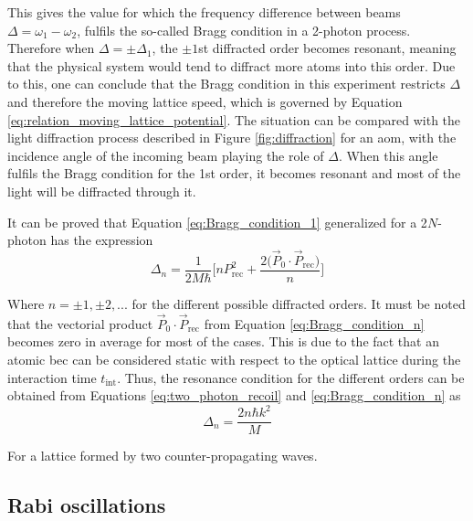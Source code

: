 This gives the value for which the frequency difference between beams $\Delta = \omega_1-\omega_2$, fulfils the so-called Bragg condition in a 2-photon process. Therefore when $\Delta = \pm\Delta_1$, the $\pm1$st diffracted order becomes resonant, meaning that the physical system would tend to diffract more atoms into this order. Due to this, one can conclude that the Bragg condition in this experiment restricts $\Delta$ and therefore the moving lattice speed, which is governed by Equation \eqref{eq:relation_moving_lattice_potential}. The situation can be compared with the light diffraction process described in Figure \ref{fig:diffraction} for an \ac{aom}, with the incidence angle of the incoming beam playing the role of $\Delta$. When this angle fulfils the Bragg condition for the 1st order, it becomes resonant and most of the light will be diffracted through it. 

It can be proved that Equation \eqref{eq:Bragg_condition_1} generalized for a 2$N$-photon has the expression \cite{Kozuma1999}
\begin{equation}\label{eq:Bragg_condition_n}
	\Delta_n = \frac{1}{2M\hbar} \Bigg[n P_{\text{rec}}^2 + \frac{2\big(\vec{P}_0 \cdot \vec{P}_{\text{rec}}\big)}{n}\Bigg]
\end{equation}

Where $n=\pm1, \pm2, \text{...}$ for the different possible diffracted orders. It must be noted that the vectorial product $\vec{P}_0 \cdot \vec{P}_{\text{rec}}$ from Equation \eqref{eq:Bragg_condition_n} becomes zero in average for most of the cases. This is due to the fact that an atomic \ac{bec} can be considered static with respect to the optical lattice during the interaction time $t_{\text{int}}$. Thus, the resonance condition for the different orders can be obtained from Equations \eqref{eq:two_photon_recoil} and \eqref{eq:Bragg_condition_n} as
\begin{equation}\label{eq:Bragg_condition}
	\Delta_n = \frac{2n\hbar k^2}{M}
\end{equation}

For a lattice formed by two counter-propagating waves.

\subsection{Rabi oscillations}

